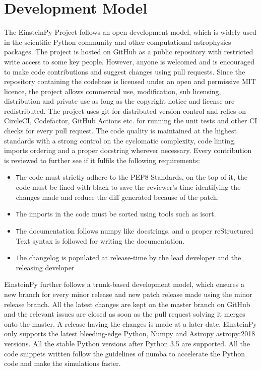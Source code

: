 \documentclass[refree]{aa}
\begin{document}
\section{Development Model}
The EinsteinPy Project follows an open development model, which is widely used in the scientific Python community and other computational astrophysics packages. The project is hosted on GitHub as a public repository with restricted write access to some key people. However, anyone is welcomed and is encouraged to make code contributions and suggest changes using pull requests. Since the repository containing the codebase is licensed under an open and permissive MIT licence,  the project allows commercial use, modification, sub licensing, distribution and private use as long as the copyright notice and license are redistributed. The project uses git for distributed version control and relies on CircleCI, Codefactor, GitHub Actions etc. for running the unit tests and other CI checks for every pull request.
The code quality is maintained at the highest standards with a strong control on the cyclomatic complexity, code linting, imports ordering and a proper docstring wherever necessary. Every contribution is reviewed to further see if it fulfils the following requirements: 


\begin{itemize}
\item \texttt The code must strictly adhere to the PEP8 Standards, on the top of it, the code must be lined with black to save the reviewer’s time identifying the changes made and reduce the diff generated because of the patch.
\item \texttt The imports in the code must be sorted using tools such as isort. 
\item \texttt The documentation follows numpy like docstrings, and a proper reStructured Text syntax is followed for writing the documentation.
\item \texttt The changelog is populated at release-time by the lead developer and the releasing developer
\end{itemize}
EinsteinPy further follows a trunk-based development model, which ensures a new branch for every minor release and new patch release made using the minor release branch. All the latest changes are kept on the master branch on GitHub and the relevant issues are closed as soon as the pull request solving it merges onto the master. A release having the changes is made at a later date. 
EinsteinPy only supports the latest bleeding-edge Python, Numpy\citep{numpy} and Astropy \citep{2019arXiv190710121V}{astropy:2018} versions.  All the stable Python versions after Python 3.5 are supported. All the code snippets written follow the guidelines of numba \citep{Lam2015NumbaAL} to accelerate the Python code and make the simulations faster. 
\end{document}
